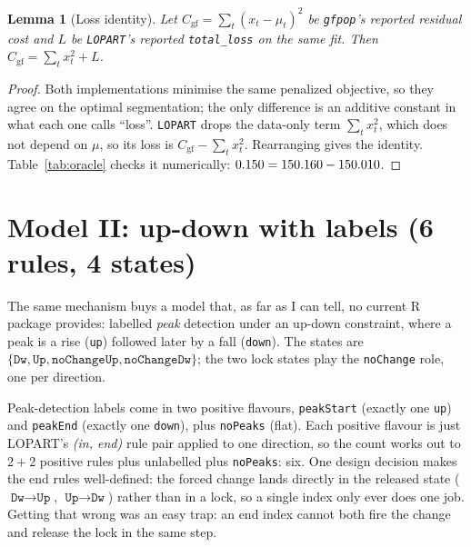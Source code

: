 \documentclass[11pt]{article}
\theoremstyle{definition}
\theoremstyle{plain}
\newtheorem{lemma}[definition]{Lemma}
\theoremstyle{remark}
\begin{document}
\begin{lemma}[Loss identity]\label{lem:loss}
Let $C_{\mathrm{gf}}=\sum_t (x_t-\hat\mu_t)^2$ be \texttt{gfpop}'s reported
residual cost and $L$ be \texttt{LOPART}'s reported \texttt{total\_loss} on the
same fit. Then $C_{\mathrm{gf}} = \sum_t x_t^2 + L$.
\end{lemma}
\begin{proof}
Both implementations minimise the same penalized objective, so they agree on the
optimal segmentation; the only difference is an additive constant in what each
one calls ``loss''. \texttt{LOPART} drops the data-only term $\sum_t x_t^2$,
which does not depend on $\mu$, so its loss is $C_{\mathrm{gf}}-\sum_t x_t^2$.
Rearranging gives the identity. Table~\ref{tab:oracle} checks it numerically:
$0.150 = 150.160 - 150.010$.
\end{proof}

\section{Model II: up-down with labels (6 rules, 4 states)}\label{sec:updown}

The same mechanism buys a model that, as far as I can tell, no current R
package provides: labelled \emph{peak} detection under an up-down constraint,
where a peak is a rise (\texttt{up}) followed later by a fall (\texttt{down}).
The states are
$\{\texttt{Dw},\texttt{Up},\texttt{noChangeUp},\texttt{noChangeDw}\}$; the two
lock states play the \texttt{noChange} role, one per direction.

Peak-detection labels come in two positive flavours, \texttt{peakStart}
(exactly one \texttt{up}) and \texttt{peakEnd} (exactly one \texttt{down}),
plus \texttt{noPeaks} (flat). Each positive flavour is just LOPART's
\emph{(in, end)} rule pair applied to one direction, so the count works out to
$2+2$ positive rules plus unlabelled plus \texttt{noPeaks}: six. One design
decision makes the end rules well-defined: the forced change lands directly in
the released state ($\texttt{Dw}\to\texttt{Up}$, $\texttt{Up}\to\texttt{Dw}$)
rather than in a lock, so a single index only ever does one job. Getting that
wrong was an easy trap: an end index cannot both fire the change and release
the lock in the same step.
\end{document}
